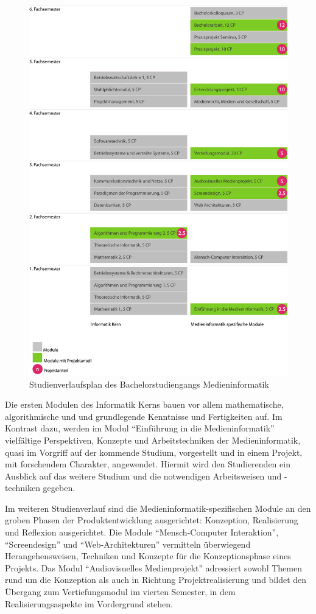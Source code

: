\begin{figure}[htbp]
\centering
\includegraphics[width=\columnwidth]{../anhaenge/bilder/ba-verlaufsplan.png}
\caption{Studienverlaufsplan des Bachelorstudiengangs Medieninformatik}
\end{figure}

Die ersten Modulen des Informatik Kerns bauen vor allem mathematische,
algorithmische und und grundlegende Kenntnisse und Fertigkeiten auf. Im
Kontrast dazu, werden im Modul ``Einführung in die Medieninformatik''
vielfältige Perspektiven, Konzepte und Arbeitstechniken der
Medieninformatik, quasi im Vorgriff auf der kommende Studium,
vorgestellt und in einem Projekt, mit forschendem Charakter, angewendet.
Hiermit wird den Studierenden ein Ausblick auf das weitere Studium und
die notwendigen Arbeitsweisen und -techniken gegeben.

Im weiteren Studienverlauf sind die Medieninformatik-spezifischen Module
an den groben Phasen der Produktentwicklung ausgerichtet: Konzeption,
Realisierung und Reflexion ausgerichtet. Die Module ``Mensch-Computer
Interaktion'', ``Screendesign'' und ``Web-Architekturen'' vermitteln
überwiegend Herangehensweisen, Techniken und Konzepte für die
Konzeptionsphase eines Projekts. Das Modul ``Audiovisuelles
Medienprojekt'' adressiert sowohl Themen rund um die Konzeption als auch
in Richtung Projektrealisierung und bildet den Übergang zum
Vertiefungsmodul im vierten Semester, in dem Realisierungsaspekte im
Vordergrund stehen.


